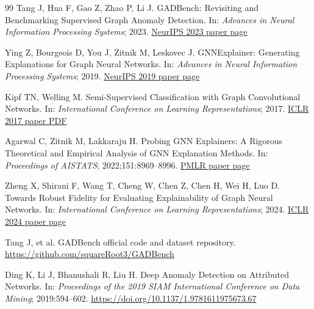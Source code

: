 \documentclass[11pt,a4paper]{article}
\begin{document}
\begin{thebibliography}{99}
Tang J, Hua F, Gao Z, Zhao P, Li J. GADBench: Revisiting and Benchmarking Supervised Graph Anomaly Detection. In: \emph{Advances in Neural Information Processing Systems}; 2023.\newline
\href{https://proceedings.neurips.cc/paper_files/paper/2023/hash/5eaafd67434a4cfb1cf829722c65f184-Abstract-Datasets_and_Benchmarks.html}{NeurIPS 2023 paper page}

Ying Z, Bourgeois D, You J, Zitnik M, Leskovec J. GNNExplainer: Generating Explanations for Graph Neural Networks. In: \emph{Advances in Neural Information Processing Systems}; 2019.\newline
\href{https://proceedings.neurips.cc/paper/2019/hash/d80b7040b773199015de6d3b4293c8ff-Abstract.html}{NeurIPS 2019 paper page}

Kipf TN, Welling M. Semi-Supervised Classification with Graph Convolutional Networks. In: \emph{International Conference on Learning Representations}; 2017.\newline
\href{https://openreview.net/pdf?id=SJU4ayYgl}{ICLR 2017 paper PDF}

Agarwal C, Zitnik M, Lakkaraju H. Probing GNN Explainers: A Rigorous Theoretical and Empirical Analysis of GNN Explanation Methods. In: \emph{Proceedings of AISTATS}; 2022;151:8969--8996.\newline
\href{https://proceedings.mlr.press/v151/agarwal22b.html}{PMLR paper page}

Zheng X, Shirani F, Wang T, Cheng W, Chen Z, Chen H, Wei H, Luo D. Towards Robust Fidelity for Evaluating Explainability of Graph Neural Networks. In: \emph{International Conference on Learning Representations}; 2024.\newline
\href{https://proceedings.iclr.cc/paper_files/paper/2024/hash/34293d684b1012ed45c3274b4a7edc00-Abstract-Conference.html}{ICLR 2024 paper page}

Tang J, et al. GADBench official code and dataset repository.\newline
\url{https://github.com/squareRoot3/GADBench}

Ding K, Li J, Bhanushali R, Liu H. Deep Anomaly Detection on Attributed Networks. In: \emph{Proceedings of the 2019 SIAM International Conference on Data Mining}; 2019:594--602.\newline
\href{https://doi.org/10.1137/1.9781611975673.67}{https://doi.org/10.1137/1.9781611975673.67}


\end{thebibliography}
\end{document}
